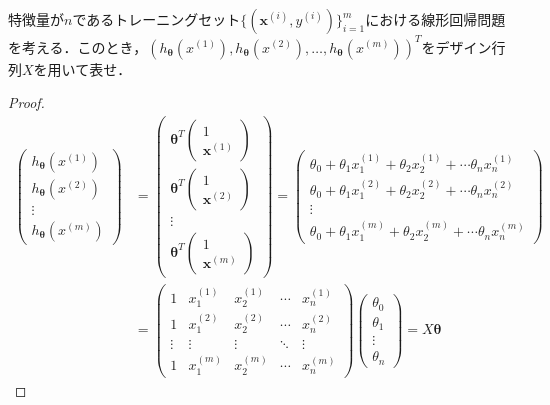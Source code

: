 \begin{qu}
特徴量が$n$であるトレーニングセット$\{({\bm x}^{(i)},y^{(i)})\}_{i=1}^m$における線形回帰問題を考える．このとき，$(h_{{\bm \theta}}(x^{(1)}),h_{{\bm \theta}}(x^{(2)}),\ldots,h_{{\bm \theta}}(x^{(m)}))^T$をデザイン行列$X$を用いて表せ．
\end{qu}
\begin{proof}
\begin{align}
\left(
\begin{array}{c}
h_{{\bm \theta}}(x^{(1)}) \\
h_{{\bm \theta}}(x^{(2)}) \\
\vdots \\
h_{{\bm \theta}}(x^{(m)})
\end{array}
\right)
&=
\left(
\begin{array}{c}
{\bm \theta}^T 
\left( 
\begin{array}{c}
1 \\
{\bm x}^{(1)}
\end{array}
\right) \\
{\bm \theta}^T 
\left( 
\begin{array}{c}
1 \\
{\bm x}^{(2)}
\end{array}
\right) \\
\vdots \\
{\bm \theta}^T 
\left( 
\begin{array}{c}
1 \\
{\bm x}^{(m)}
\end{array}
\right)
\end{array}
\right)
=
\left(
\begin{array}{c}
\theta_0 +\theta_1 x_1^{(1)}+\theta_2 x_2^{(1)}+\cdots \theta_n x_n^{(1)} \\
\theta_0 +\theta_1 x_1^{(2)}+\theta_2 x_2^{(2)}+\cdots \theta_n x_n^{(2)} \\
\vdots \\
\theta_0 +\theta_1 x_1^{(m)}+\theta_2 x_2^{(m)}+\cdots \theta_n x_n^{(m)} 
\end{array}
\right) \nonumber \\
&=
\left(
\begin{array}{ccccc}
1 & x_1^{(1)} & x_2^{(1)} & \cdots & x_n^{(1)} \\
1 & x_1^{(2)} & x_2^{(2)} & \cdots & x_n^{(2)} \\
\vdots & \vdots & \vdots & \ddots & \vdots \\
1 & x_1^{(m)} & x_2^{(m)} & \cdots & x_n^{(m)} 
\end{array}
\right)
\left(
\begin{array}{c}
\theta_0 \\
\theta_1 \\
\vdots \\
\theta_n
\end{array}
\right)
=X {\bm \theta}
\end{align}
\end{proof}

